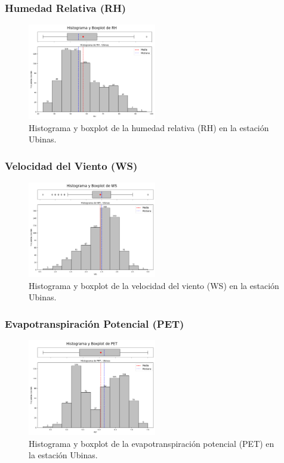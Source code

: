 \subsubsection*{Humedad Relativa (RH)}
\begin{figure}[H]
\centering
\includegraphics[width=0.5\textwidth]{resultados/por_estacion_meteorologica/Ubinas/RH_histograma.png}
\caption{Histograma y boxplot de la humedad relativa (RH) en la estación Ubinas.}
\label{fig:ubinas_RH}
\end{figure}

\subsubsection*{Velocidad del Viento (WS)}
\begin{figure}[H]
\centering
\includegraphics[width=0.5\textwidth]{resultados/por_estacion_meteorologica/Ubinas/WS_histograma.png}
\caption{Histograma y boxplot de la velocidad del viento (WS) en la estación Ubinas.}
\label{fig:ubinas_WS}
\end{figure}

\subsubsection*{Evapotranspiración Potencial (PET)}
\begin{figure}[H]
\centering
\includegraphics[width=0.5\textwidth]{resultados/por_estacion_meteorologica/Ubinas/PET_histograma.png}
\caption{Histograma y boxplot de la evapotranspiración potencial (PET) en la estación Ubinas.}
\label{fig:ubinas_PET}
\end{figure}

